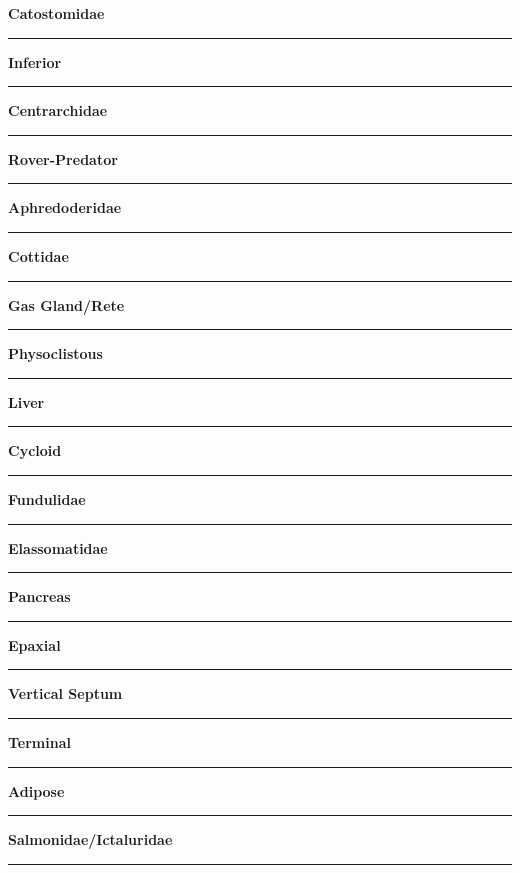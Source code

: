 \documentclass[11pt]{exam}
\newcommand*\Matching[1]{
\ifprintanswers
	\textbf{#1}
\else
	\rule{2.1in}{0.4pt}
\fi
}
\newlength\matchlena
\newlength\matchlenb
\newcommand\MatchQuestion[2]{%
	\setlength\matchlenb{\linewidth}
	\addtolength\matchlenb{-\matchlena}
	\parbox[t]{\matchlena}{\Matching{#1}}\enspace\parbox[t]{\matchlenb}{#2}}
\begin{document}
\begin{questions}
\begin{multicols}{2}
\question\MatchQuestion{Catostomidae}{}
\vspace{2\baselineskip}

\question\MatchQuestion{Inferior}{}
\vspace{2\baselineskip}

\question\MatchQuestion{Centrarchidae}{}
\vspace{2\baselineskip}

\question\MatchQuestion{Rover-Predator}{}
\vspace{2\baselineskip}

\question\MatchQuestion{Aphredoderidae}{}
\vspace{2\baselineskip}

\question\MatchQuestion{Cottidae}{}
\vspace{2\baselineskip}

\question\MatchQuestion{Gas Gland/Rete}{}
\vspace{2\baselineskip}

\question\MatchQuestion{Physoclistous}{}
\vspace{2\baselineskip}

\question\MatchQuestion{Liver}{}
\vspace{2\baselineskip}

\question\MatchQuestion{Cycloid}{}
\vspace{2\baselineskip}

\question\MatchQuestion{Fundulidae}{}
\vspace{2\baselineskip}

\question\MatchQuestion{Elassomatidae}{}
\vspace{2\baselineskip}

\question\MatchQuestion{Pancreas}{}
\vspace{2\baselineskip}

\question\MatchQuestion{Epaxial}{}
\vspace{2\baselineskip}

\question\MatchQuestion{Vertical Septum}{}
\vspace{2\baselineskip}

\question\MatchQuestion{Terminal}{}
\vspace{2\baselineskip}

\question\MatchQuestion{Adipose}{}
\vspace{2\baselineskip}

\question[\textsc{ec}]\MatchQuestion{Salmonidae/Ictaluridae}{}
\vspace{2\baselineskip}


\end{multicols}
\end{questions}
\end{document}

